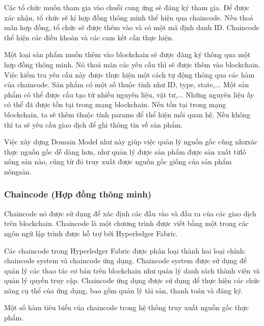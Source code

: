 Các tổ chức muốn tham gia vào chuỗi cung ứng sẽ đăng ký tham gia. Để được xác nhận, 
tổ chức sẽ kí hợp đồng thông minh thể hiện qua chaincode. Nếu thoả mãn hợp đồng, 
tổ chức sẽ được thêm vào và có một mã định danh ID. Chaincode thể hiện các điều khoản
và các cam kết cần thực hiện. 

Một loại sản phẩm muốn thêm vào blockchain sẽ được đăng ký thông qua một hợp đồng 
thông minh. Nó thoả mãn các yêu cầu thì sẽ được thêm vào blockchain. Việc kiểm tra 
yêu cầu này được thực hiện một cách tự động thông qua các hàm của chaincode. Sản phẩm có một 
số thuộc tính như ID, type, state,...
Một sản phẩm có thể được cấu tạo từ nhiều nguyên liệu, vật tư,... Những nguyên liệu ấy
có thể đã được tồn tại trong mạng blockchain. Nếu tồn tại trong mạng blockchain, ta sẽ thêm 
thuộc tính params để thể hiện mối quan hệ. Nếu không thì ta sẽ yêu cầu giao dịch
để ghi thông tin về sản phẩm. 

Việc xây dựng Domain Model như này giúp việc quản lý nguồn gốc cũng nhưxác thực nguồn gốc dễ dàng hơn, như quản lý được sản phẩm được sản xuất từlô nông sản nào, cũng từ đó truy xuất được nguồn gốc giống của sản phẩm nôngsản.
\subsubsection{Chaincode (Hợp đồng thông minh)}
Chaincode nó được sử dụng để xác định các đầu vào và đầu ra của các giao dịch trên blockchain. Chaincode là một chương trình được 
viết bằng một trong các ngôn ngữ lập trình được hỗ trợ bởi Hyperledger Fabric.

Các chaincode trong Hyperledger Fabric được phân loại thành hai loại chính: chaincode system và chaincode ứng dụng. Chaincode system được sử dụng để quản lý các thao tác cơ bản trên blockchain như quản lý danh sách thành viên và quản lý quyền truy cập. Chaincode ứng dụng được sử dụng để thực hiện các chức năng cụ thể của ứng dụng, bao gồm quản lý tài sản, thanh toán và đăng ký.

Một số hàm tiêu biểu của chaincode trong hệ thống truy xuất nguồn gốc thực phẩm.

